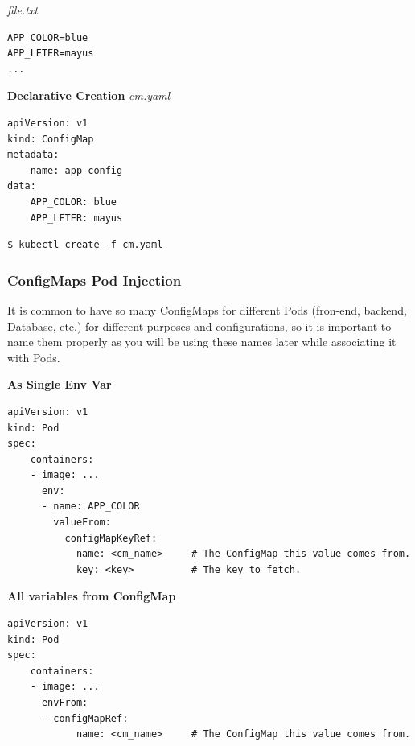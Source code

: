 \documentclass{article}
\newenvironment{blocktemplateI}[1]{%
    \tcolorbox[beamer,%
    noparskip,breakable,
    colframe=Violet,%
    colbacklower=Black,%
    title=#1]}%
    {\endtcolorbox}
\newenvironment{codetemplate}[1][]{%
  \mybasecolorbox[#1]
  \itshape
}{%
  \endmybasecolorbox
}
\begin{document}
\begin{codetemplate}{file.txt}
\begin{verbatim}
APP_COLOR=blue
APP_LETER=mayus
...
\end{verbatim}
\end{codetemplate}

\textbf{Declarative Creation}
\begin{codetemplate}{cm.yaml}
\begin{verbatim}
apiVersion: v1
kind: ConfigMap
metadata:
    name: app-config
data:
    APP_COLOR: blue
    APP_LETER: mayus
\end{verbatim}
\end{codetemplate}
\begin{codetemplate}{}
\begin{verbatim}
$ kubectl create -f cm.yaml
\end{verbatim}
\end{codetemplate}


\subsubsection{ConfigMaps Pod Injection}

\begin{blocktemplateI}{NOTE}
It is common to have so many ConfigMaps for different Pods (fron-end, backend, Database, etc.) for different purposes and configurations, so it is important to name them properly as you will be using these names later while associating it with Pods.
\end{blocktemplateI}

\textbf{As Single Env Var}
\begin{codetemplate}{}
\begin{verbatim}
apiVersion: v1
kind: Pod
spec:
    containers:
    - image: ...
      env:
      - name: APP_COLOR
        valueFrom:
          configMapKeyRef:
            name: <cm_name>     # The ConfigMap this value comes from.
            key: <key>          # The key to fetch.
\end{verbatim}
\end{codetemplate}

\textbf{All variables from ConfigMap}
\begin{codetemplate}{}
\begin{verbatim}
apiVersion: v1
kind: Pod
spec:
    containers:
    - image: ...
      envFrom:
      - configMapRef:
            name: <cm_name>     # The ConfigMap this value comes from.
\end{verbatim}
\end{codetemplate}
\end{document}
